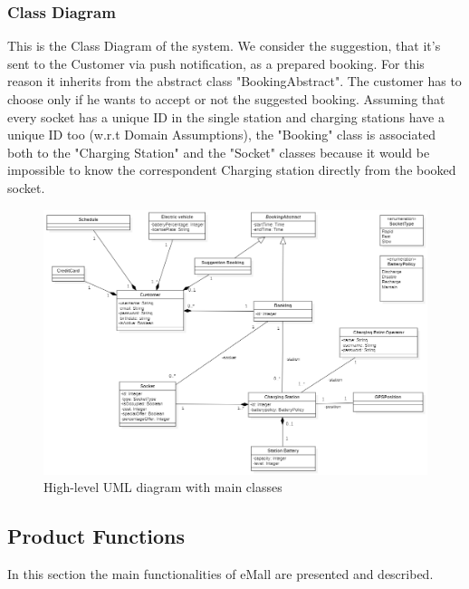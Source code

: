 \subsubsection{Class Diagram}
This is the Class Diagram of the system.
We consider the suggestion, that it's sent to the Customer via push notification, as a prepared booking. For this reason it inherits from the abstract class "BookingAbstract". The customer has to choose only if he wants to accept or not the suggested booking.
Assuming that every socket has a unique ID in the single station and charging stations have a unique ID too (w.r.t Domain Assumptions), the "Booking" class is associated both to the "Charging Station" and the "Socket" classes because it would be impossible to know the correspondent Charging station directly from the booked socket.


\begin{figure}
    \centering 
   
    \includegraphics[scale=0.46]{img/ClassDiagram.PNG}
   \caption{High-level UML diagram with main classes}
   \label{class_diagram}

\end{figure}



\subsection{Product Functions}
In this section the main functionalities of eMall are presented and described.
